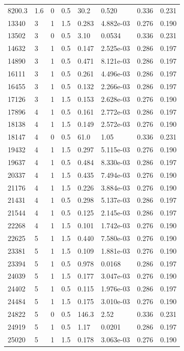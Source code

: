 \documentclass[preview]{standalone}
\begin{document}
{{\begin{tabular}{L{1.2cm}C{1.2cm} C{0.3cm}C{0.5cm} C{1.4cm}C{1.4cm} C{1.4cm}C{1.4cm}}
  8200.3  &   1.6  & 0     & 0.5 &  30.2  & 0.520  & 0.336 &  0.231   \\ 
  13340  &     3  & 1     & 1.5 &  0.283  & 4.882e-03  & 0.276 &  0.190   \\ 
  13502  &     3  & 0     & 0.5 &  3.10  & 0.0534  & 0.336 &  0.231   \\ 
  14632  &     3  & 1     & 0.5 &  0.147  & 2.525e-03  & 0.286 &  0.197   \\ 
  14890  &     3  & 1     & 0.5 &  0.471  & 8.121e-03  & 0.286 &  0.197   \\ 
  16111  &     3  & 1     & 0.5 &  0.261  & 4.496e-03  & 0.286 &  0.197   \\ 
  16455  &     3  & 1     & 0.5 &  0.132  & 2.266e-03  & 0.286 &  0.197   \\ 
  17126  &     3  & 1     & 1.5 &  0.153  & 2.628e-03  & 0.276 &  0.190   \\ 
  17896  &     4  & 1     & 0.5 &  0.161  & 2.772e-03  & 0.286 &  0.197   \\ 
  18138  &     4  & 1     & 1.5 &  0.149  & 2.572e-03  & 0.276 &  0.190   \\ 
  18147  &     4  & 0     & 0.5 &  61.0  & 1.05  & 0.336 &  0.231   \\ 
  19432  &     4  & 1     & 1.5 &  0.297  & 5.115e-03  & 0.276 &  0.190   \\ 
  19637  &     4  & 1     & 0.5 &  0.484  & 8.330e-03  & 0.286 &  0.197   \\ 
  20337  &     4  & 1     & 1.5 &  0.435  & 7.494e-03  & 0.276 &  0.190   \\ 
  21176  &     4  & 1     & 1.5 &  0.226  & 3.884e-03  & 0.276 &  0.190   \\ 
  21431  &     4  & 1     & 0.5 &  0.298  & 5.137e-03  & 0.286 &  0.197   \\ 
  21544  &     4  & 1     & 0.5 &  0.125  & 2.145e-03  & 0.286 &  0.197   \\ 
  22268  &     4  & 1     & 1.5 &  0.101  & 1.742e-03  & 0.276 &  0.190   \\ 
  22625  &     5  & 1     & 1.5 &  0.440  & 7.580e-03  & 0.276 &  0.190   \\ 
  23381  &     5  & 1     & 1.5 &  0.109  & 1.881e-03  & 0.276 &  0.190   \\ 
  23394  &     5  & 1     & 0.5 &  0.978  & 0.0168  & 0.286 &  0.197   \\ 
  24039  &     5  & 1     & 1.5 &  0.177  & 3.047e-03  & 0.276 &  0.190   \\ 
  24402  &     5  & 1     & 0.5 &  0.115  & 1.976e-03  & 0.286 &  0.197   \\ 
  24484  &     5  & 1     & 1.5 &  0.175  & 3.010e-03  & 0.276 &  0.190   \\ 
  24822  &     5  & 0     & 0.5 &  146.3  & 2.52  & 0.336 &  0.231   \\ 
  24919  &     5  & 1     & 0.5 &  1.17  & 0.0201  & 0.286 &  0.197   \\ 
  25020  &     5  & 1     & 1.5 &  0.178  & 3.063e-03  & 0.276 &  0.190   \\ 
\hline 
\end{tabular} 

}}
\end{document}

